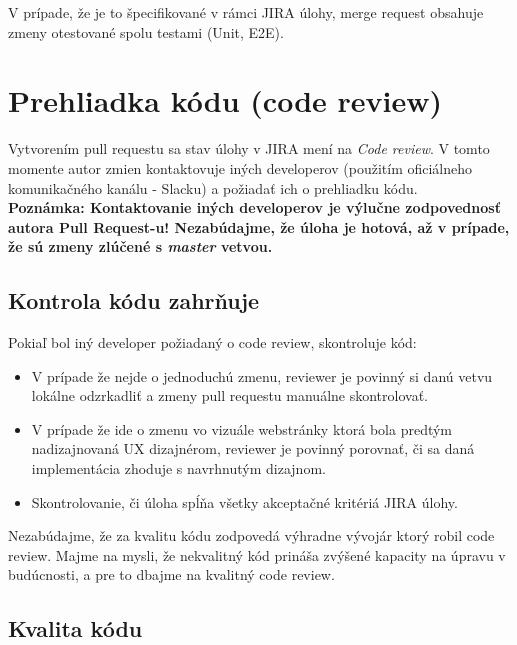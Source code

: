 \documentclass{article}
\begin{document}
    \noindent V prípade, že je to špecifikované v rámci JIRA úlohy, merge request obsahuje zmeny otestované spolu testami (Unit, E2E).


    \section*{Prehliadka kódu (code review)}

    Vytvorením pull requestu sa stav úlohy v JIRA mení na \emph{Code review}.
    V tomto momente autor zmien kontaktovuje iných developerov (použitím oficiálneho
    komunikačného kanálu - Slacku) a požiadať ich o prehliadku kódu.\\

    \noindent \textbf{Poznámka: Kontaktovanie iných developerov je výlučne zodpovednosť autora Pull Request-u!
    Nezabúdajme, že úloha je hotová, až v prípade, že sú zmeny zlúčené s \emph{master} vetvou.} \\

    \subsection*{Kontrola kódu zahrňuje}

    \noindent Pokiaľ bol iný developer požiadaný o code review, skontroluje kód:

    \begin{itemize}
        \item V prípade že nejde o jednoduchú zmenu, reviewer je povinný si danú vetvu lokálne odzrkadliť a zmeny pull
        requestu manuálne skontrolovať.
        \item V prípade že ide o zmenu vo vizuále webstránky ktorá bola predtým nadizajnovaná UX dizajnérom, reviewer je povinný
        porovnať, či sa daná implementácia zhoduje s navrhnutým dizajnom.
        \item Skontrolovanie, či úloha spĺňa všetky akceptačné kritériá JIRA úlohy.
    \end{itemize}

    \noindent Nezabúdajme, že za kvalitu kódu zodpovedá výhradne vývojár ktorý robil code review. Majme na mysli, že nekvalitný kód
    prináša zvýšené kapacity na úpravu v budúcnosti, a pre to dbajme na kvalitný code review.

    \pagebreak

    \subsection*{Kvalita kódu}
\end{document}
